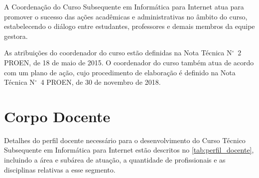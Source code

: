 \documentclass[
	12pt,				%
	openright,			%
	twoside,			%
	a4paper,			%
	chapter=TITLE,		%
	english,			%
	french,				%
	spanish,			%
	brazil,				%
	]{abntex2}
\newcommand{\n}{N$^\circ$}
\begin{document}
A Coordenação do Curso Subsequente em Informática para Internet atua para promover o sucesso das ações acadêmicas e administrativas no âmbito do curso, estabelecendo o diálogo entre estudantes, professores e demais membros da equipe gestora.

As atribuições do coordenador do curso estão definidas na Nota Técnica \n~2 PROEN, de 18 de maio de 2015. O coordenador do curso também atua de acordo com um plano de ação, cujo procedimento de elaboração é definido na Nota Técnica \n~4 PROEN, de 30 de novembro de 2018.


\chapter{Corpo Docente}


Detalhes do perfil docente necessário para o desenvolvimento do Curso Técnico Subsequente em Informática para Internet  estão descritos no \autoref{tab:perfil_docente},  incluindo a área e subárea de atuação, a quantidade de profissionais e as disciplinas relativas a esse segmento.
\end{document}
